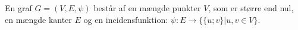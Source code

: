 \begin{defn}
[Graf] 
En graf $G=(V,E,\psi)$ består af en mængde punkter $V$, som er større end nul, en mængde kanter $E$ og en incidensfunktion: $\psi: E \rightarrow \{\{u;v\}|u,v \in V\}$.
\end{defn}


